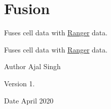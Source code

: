 \hypertarget{group__Fusion}{}\section{Fusion}
\label{group__Fusion}


Fuses cell data with \hyperlink{classRanger}{Ranger} data.  


Fuses cell data with \hyperlink{classRanger}{Ranger} data. 

\begin{DoxyAuthor}{Author}
Ajal Singh 
\end{DoxyAuthor}
\begin{DoxyVersion}{Version}
1. 
\end{DoxyVersion}
\begin{DoxyDate}{Date}
April 2020 
\end{DoxyDate}
